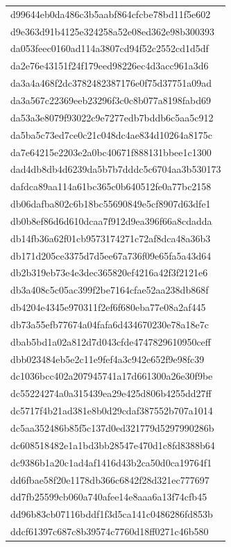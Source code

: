 \begin{tabular}{l}
d99644eb0da486c3b5aabf864cfcbe78bd11f5e602 \\
d9e363d91b4125e324258a52e08ed362e98b300393 \\
da053feec0160ad114a3807cd94f52c2552cd1d5df \\
da2e76e43151f24f179eed98226ec4d3acc961a3d6 \\
da3a4a468f2dc3782482387176e0f75d37751a09ad \\
da3a567c22369eeb23296f3c0c8b077a8198fabd69 \\
da53a3e8079f93022c9e7277edb7bddb6c5aa5c912 \\
da5ba5c73ed7ce0c21c048dc4ae834d10264a8175c \\
da7e64215e2203e2a0bc40671f888131bbee1c1300 \\
dad4db8db4d6239da5b7b7dddc5c6704aa3b530173 \\
dafdca89aa114a61bc365c0b640512fe0a77bc2158 \\
db06dafba802c6b18bc55690849e5cf8907d63dfe1 \\
db0b8ef86d6d610dcaa7f912d9ea396f66a8cdadda \\
db14fb36a62f01cb9573174271c72af8dca48a36b3 \\
db171d205ce3375d7d5ee67a736f09e65fa5a43d64 \\
db2b319eb73e4e3dec365820ef4216a42f3f2121e6 \\
db3a408c5c05ac399f2be7164cfae52aa238db868f \\
db4204e4345e970311f2ef6f680eba77e08a2af445 \\
db73a55efb77674a04fafa6d434670230e78a18e7c \\
dbab5bd1a02a812d7d043cfde4747829610950ceff \\
dbb023484eb5e2c11e9fef4a3c942e652f9e98fc39 \\
dc1036bcc402a207945741a17d661300a26e30f9be \\
dc55224274a0a315439ea29e425d806b4255dd27ff \\
dc5717f4b21ad381e8b0d29cdaf387552b707a1014 \\
dc5aa352486b85f5c137d0ed321779d5297990286b \\
dc608518482e1a1bd3bb28547e470d1c8fd8388b64 \\
dc9386b1a20c1ad4af1416d43b2ca50d0ca19764f1 \\
dd6fbae58f20e1178db366c6842f28d321ec777697 \\
dd7fb25599cb060a740afee14e8aaa6a13f74cfb45 \\
dd96b83cb07116bddf1f3d5ca141c0486286fd853b \\
ddcf61397c687c8b39574c7760d18ff0271c46b580 \\

\end{tabular}
